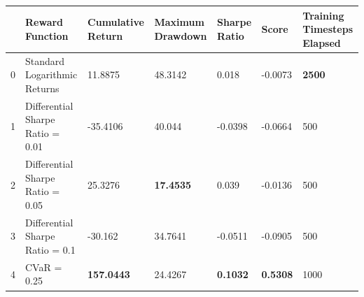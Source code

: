 \begin{tabular}{lllllll}
\toprule
 & Reward Function & Cumulative Return & Maximum Drawdown & Sharpe Ratio & Score & Training Timesteps Elapsed \\
\midrule
0 & Standard Logarithmic Returns & 11.8875 & 48.3142 & 0.018 & -0.0073 & \textbf{2500} \\
1 & Differential Sharpe Ratio = 0.01 & -35.4106 & 40.044 & -0.0398 & -0.0664 & 500 \\
2 & Differential Sharpe Ratio = 0.05 & 25.3276 & \textbf{17.4535} & 0.039 & -0.0136 & 500 \\
3 & Differential Sharpe Ratio = 0.1 & -30.162 & 34.7641 & -0.0511 & -0.0905 & 500 \\
4 & CVaR = 0.25 & \textbf{157.0443} & 24.4267 & \textbf{0.1032} & \textbf{0.5308} & 1000 \\
\bottomrule
\end{tabular}
